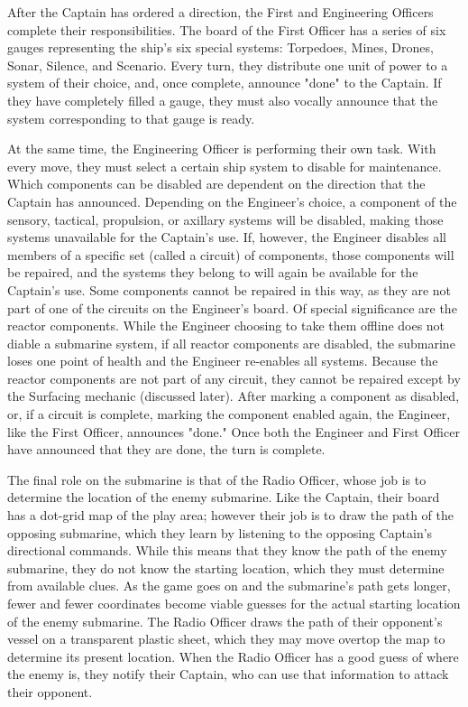 
After the Captain has ordered a direction, the First and Engineering Officers complete their responsibilities. The board of the First Officer has a series of six gauges representing the ship's six special systems: Torpedoes, Mines, Drones, Sonar, Silence, and Scenario.  Every turn, they distribute one unit of power to a system of their choice, and, once complete, announce "done" to the Captain. If they have completely filled a gauge, they must also vocally announce that the system corresponding to that gauge is ready.


At the same time, the Engineering Officer is performing their own task. With every move, they must select a certain ship system to disable for maintenance. Which components can be disabled are dependent on the direction that the Captain has announced. Depending on the Engineer's choice, a component of the sensory, tactical, propulsion, or axillary systems will be disabled, making those systems unavailable for the Captain's use. If, however, the Engineer disables all members of a specific set (called a circuit) of components, those components will be repaired, and the systems they belong to will again be available for the Captain's use. Some components cannot be repaired in this way, as they are not part of one of the circuits on the Engineer's board. Of special significance are the reactor components. While the Engineer choosing to take them offline does not diable a submarine system, if all reactor components are disabled, the submarine loses one point of health and the Engineer re-enables all systems. Because the reactor components are not part of any circuit, they cannot be repaired except by the Surfacing mechanic (discussed later). After marking a component as disabled, or, if a circuit is complete, marking the component enabled again, the Engineer, like the First Officer, announces "done." Once both the Engineer and First Officer have announced that they are done, the turn is complete. 


The final role on the submarine is that of the Radio Officer, whose job is to determine the location of the enemy submarine. Like the Captain, their board has a dot-grid map of the play area; however their job is to draw the path of the opposing submarine, which they learn by listening to the opposing Captain's directional commands. While this means that they know the path of the enemy submarine, they do not know the starting location, which they must determine from available clues. As the game goes on and the submarine's path gets longer, fewer and fewer coordinates become viable guesses for the actual starting location of the enemy submarine. The Radio Officer draws the path of their opponent's vessel on a transparent plastic sheet, which they may move overtop the map to determine its present location. When the Radio Officer has a good guess of where the enemy is, they notify their Captain, who can use that information to attack their opponent.

